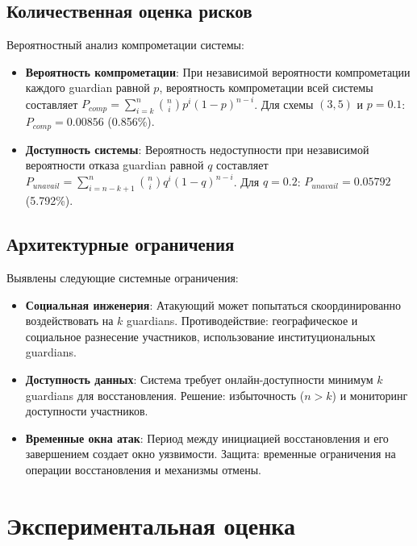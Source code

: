 \subsection{Количественная оценка рисков}

Вероятностный анализ компрометации системы:

\begin{itemize}
\item
\textbf{Вероятность компрометации}: При независимой вероятности компрометации каждого guardian равной $p$, вероятность компрометации всей системы составляет $P_{comp} = \sum_{i=k}^{n} \binom{n}{i} p^i (1-p)^{n-i}$. Для схемы $(3,5)$ и $p = 0.1$: $P_{comp} = 0.00856$ (0.856\%).

\item
\textbf{Доступность системы}: Вероятность недоступности при независимой вероятности отказа guardian равной $q$ составляет $P_{unavail} = \sum_{i=n-k+1}^{n} \binom{n}{i} q^i (1-q)^{n-i}$. Для $q = 0.2$: $P_{unavail} = 0.05792$ (5.792\%).
\end{itemize}

\subsection{Архитектурные ограничения}

Выявлены следующие системные ограничения:

\begin{itemize}
\item
\textbf{Социальная инженерия}: Атакующий может попытаться скоординированно воздействовать на $k$ guardians. Противодействие: географическое и социальное разнесение участников, использование институциональных guardians.

\item
\textbf{Доступность данных}: Система требует онлайн-доступности минимум $k$ guardians для восстановления. Решение: избыточность ($n > k$) и мониторинг доступности участников.

\item
\textbf{Временные окна атак}: Период между инициацией восстановления и его завершением создает окно уязвимости. Защита: временные ограничения на операции восстановления и механизмы отмены.
\end{itemize}

\section{Экспериментальная оценка}

